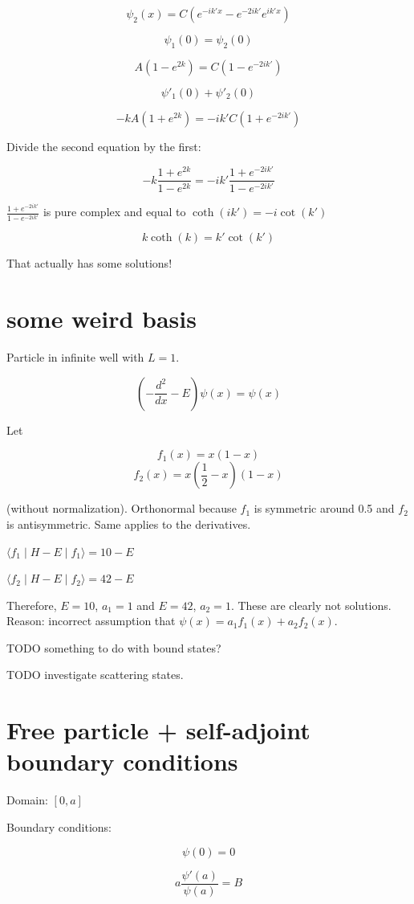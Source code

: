 \documentclass[12pt, a4paper]{article}
\begin{document}
$$\psi_2(x) = C (e^{-ik'x} - e^{-2ik'} e^{ik'x})$$

$$\psi_1(0) = \psi_2(0)$$

$$A (1 - e^{2k}) = C (1 - e^{-2ik'})$$

$$\psi'_1(0) + \psi'_2(0)$$

$$-k A (1 + e^{2k}) = -ik' C (1 + e^{-2ik'})$$

Divide the second equation by the first:

$$-k \frac{1 + e^{2k}}{1 - e^{2k}} = -ik' \frac{1 + e^{-2ik'}}{1 - e^{-2ik'}}$$

$\frac{1 + e^{-2ik'}}{1 - e^{-2ik'}}$ is pure complex and equal to $\coth(ik') = -i \cot(k')$

$$k \coth(k) = k' \cot(k')$$

That actually has some solutions!

\section{some weird basis}
Particle in infinite well with $L = 1$.

$$(-\frac{d^2}{dx} - E) \psi(x) = \psi(x)$$

Let

$$f_1(x) = x (1 - x)$$
$$f_2(x) = x (\frac{1}{2} - x) (1 - x)$$

(without normalization). Orthonormal because $f_1$ is symmetric around 0.5 and $f_2$ is antisymmetric. Same applies to the derivatives.

$\langle f_1 \mid H - E \mid f_1 \rangle = 10 - E$

$\langle f_2 \mid H - E \mid f_2 \rangle = 42 - E$

Therefore, $E = 10$, $a_1 = 1$ and $E = 42$, $a_2 = 1$. These are clearly not solutions. Reason: incorrect assumption that $\psi(x) = a_1 f_1(x) + a_2 f_2(x)$.


TODO something to do with bound states?

TODO investigate scattering states.

\section{Free particle + self-adjoint boundary conditions}

Domain: $[0, a]$

Boundary conditions:

$$\psi(0) = 0$$

$$a\frac{\psi'(a)}{\psi(a)} = B$$
\end{document}
